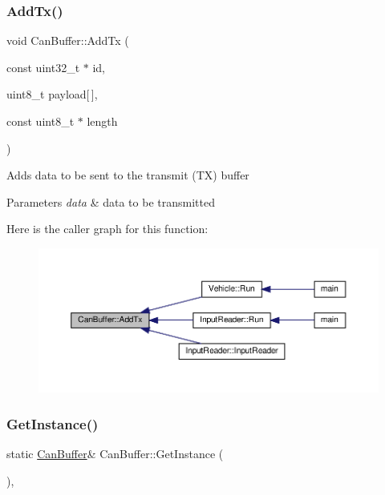 \subsubsection{\texorpdfstring{Add\+Tx()}{AddTx()}}
{\footnotesize\ttfamily void Can\+Buffer\+::\+Add\+Tx (\begin{DoxyParamCaption}\item[{const uint32\+\_\+t $\ast$}]{id,  }\item[{uint8\+\_\+t}]{payload\mbox{[}$\,$\mbox{]},  }\item[{const uint8\+\_\+t $\ast$}]{length }\end{DoxyParamCaption})}

Adds data to be sent to the transmit (TX) buffer 
\begin{DoxyParams}{Parameters}
{\em data} & data to be transmitted \\
\hline
\end{DoxyParams}
Here is the caller graph for this function\+:
\nopagebreak
\begin{figure}[H]
\begin{center}
\leavevmode
\includegraphics[width=350pt]{classCanBuffer_a9f61d33ebf8b9b98fb30998074351b90_icgraph}
\end{center}
\end{figure}
\mbox{\label{classCanBuffer_add61873bc4e32e5b79ca665c1926f3b9}} 
\subsubsection{\texorpdfstring{Get\+Instance()}{GetInstance()}}
{\footnotesize\ttfamily static \hyperlink{classCanBuffer}{Can\+Buffer}\& Can\+Buffer\+::\+Get\+Instance (\begin{DoxyParamCaption}{ }\end{DoxyParamCaption})\hspace{0.3cm}{\ttfamily [inline]}, {\ttfamily [static]}}

